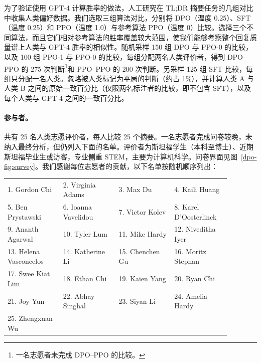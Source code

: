 为了验证使用 GPT-4 计算胜率的做法，人工研究在 TL;DR 摘要任务的几组对比中收集人类偏好数据。我们选取三组算法对比，分别将 DPO（温度 0.25）、SFT（温度 0.25）和 PPO（温度 1.0）与参考算法 PPO（温度 0）比较。选择三个不同算法，而且它们相对参考算法的胜率覆盖较大范围，使我们能够考察整个回复质量谱上人类与 GPT-4 胜率的相似性。随机采样 150 组 DPO 与 PPO-0 的比较，以及 100 组 PPO-1 与 PPO-0 的比较，每组分配两名人类评价者，得到 DPO--PPO 的 275 次判断\footnote{一名志愿者未完成 DPO--PPO 的比较。}和 PPO--PPO 的 200 次判断。另采样 125 组 SFT 比较，每组只分配一名人类。忽略被人类标记为平局的判断（约占 1\%），并计算人类 A 与人类 B 之间的原始一致百分比（仅限两名标注者的比较，即不包含 SFT），以及每个人类与 GPT-4 之间的一致百分比。

\paragraph{参与者。}共有 25 名人类志愿评价者，每人比较 25 个摘要。一名志愿者完成问卷较晚，未纳入最终分析，但仍列入下面的名单。评价者为斯坦福学生（本科至博士）、近期斯坦福毕业生或访客，专业侧重 STEM，主要为计算机科学。问卷界面见图~\ref{dpo-fig:survey}。我们感谢每位志愿者的贡献，以下名单按随机顺序列出：

\begingroup\setlength{\LTcapwidth}{.97\linewidth}
\begin{longtable}{p{0.22\linewidth}p{0.22\linewidth}p{0.22\linewidth}p{0.22\linewidth}}

1. Gordon Chi         & 2. Virginia Adams      & 3. Max Du             & 4. Kaili Huang        \\
5. Ben Prystawski     & 6. Ioanna Vavelidou    & 7. Victor Kolev       & 8. Karel D'Oosterlinck\\
9. Ananth Agarwal     & 10. Tyler Lum          & 11. Mike Hardy        & 12. Niveditha Iyer         \\
13. Helena Vasconcelos& 14. Katherine Li       & 15. Chenchen Gu       & 16. Moritz Stephan    \\
17. Swee Kiat Lim     & 18. Ethan Chi          & 19. Kaien Yang        & 20. Ryan Chi          \\
21. Joy Yun           & 22. Abhay Singhal      & 23. Siyan Li          & 24. Amelia Hardy      \\
25. Zhengxuan Wu      &                        &                       &                       \\

\end{longtable}
\endgroup



